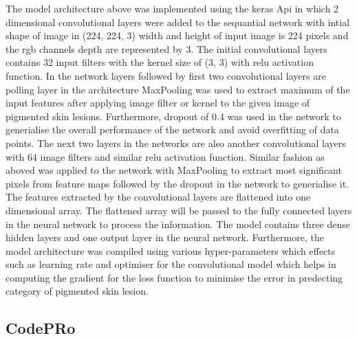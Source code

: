 The model architecture above was implemented using the keras Api in which 2 dimensional 
convolutional layers were added to the sequantial network with intial shape of image in (224, 224, 3) width and height of input image is 224 pixels and the rgb channels depth 
are represented by 3. The initial convolutional layers contains 32 input filters with the kernel size of (3, 3) with relu 
activation function. In the network layers followed by first two convolutional layers are polling layer in the 
architecture MaxPooling was used to extract maximum of the input features after applying image filter or kernel 
to the given image of pigmented skin lesions. Furthermore, dropout of 0.4 was used in the network to generialise the 
overall performance of the network and avoid overfitting of data points. 
The next two layers in the networks are also another convolutional layers with 64 image filters and similar relu activation function. Similar fashion as aboved was 
applied to the network with MaxPooling to extract most significant pixels from feature maps followed by the dropout in the network to generialise it.
The features extracted by the convolutional layers are flattened into one dimensional array. The flattened array will be passed to the fully connected layers in the neural network
to process the information. The model contains three dense hidden layers and one output layer in the neural network.
Furthermore, the model architecture was compiled using various hyper-parameters which effects such as learning rate and 
optimiser for the convolutional model which helps in computing the gradient for the loss function to minimise the error in predecting 
category of pigmented skin lesion.

\subsection{CodePRo}